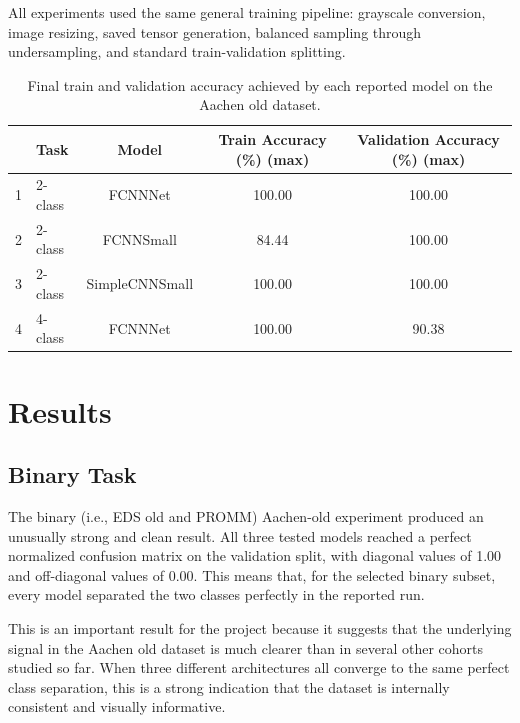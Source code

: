 \documentclass[11pt,a4paper]{article}
\begin{document}
All experiments used the same general training pipeline: grayscale conversion, image resizing, saved tensor generation, balanced sampling through undersampling, and standard train-validation splitting.

\begin{table}[H]
    \centering
    \begin{tabular}{|c|l|c|c|c|}
        \toprule
        & \textbf{Task} & \textbf{Model} & \textbf{Train Accuracy (\%) (max)} & \textbf{Validation Accuracy (\%) (max)} \\
        \midrule
        1 & 2-class & FCNNNet & 100.00 & 100.00 \\
        2 & 2-class & FCNNSmall & 84.44 & 100.00 \\
        3 & 2-class & SimpleCNNSmall & 100.00 & 100.00 \\
        4 & 4-class & FCNNNet & 100.00 & 90.38 \\
        \bottomrule
    \end{tabular}
    \caption{Final train and validation accuracy achieved by each reported model on the Aachen old dataset.}
\end{table}

\section{Results}

\subsection{Binary Task}

The binary (i.e., EDS old and PROMM) Aachen-old experiment produced an unusually strong and clean result. All three tested models reached a perfect normalized confusion matrix on the validation split, with diagonal values of 1.00 and off-diagonal values of 0.00. This means that, for the selected binary subset, every model separated the two classes perfectly in the reported run.

This is an important result for the project because it suggests that the underlying signal in the Aachen old dataset is much clearer than in several other cohorts studied so far. When three different architectures all converge to the same perfect class separation, this is a strong indication that the dataset is internally consistent and visually informative.
\end{document}
